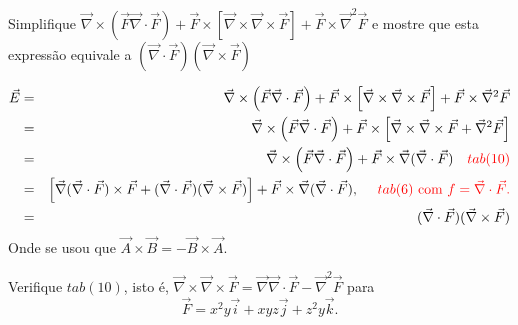 \begin{exeresol}
Simplifique $\vec{\nabla}\times\left(\vec{F}\vec{\nabla}\cdot\vec{F}\right)+\vec{F}\times\left[\vec{\nabla}\times\vec{\nabla}\times \vec{F}\right]+\vec{F}\times \vec{\nabla}^2\vec{F}$ e mostre que esta expressão equivale a $(\vec{\nabla}\cdot\vec{F})(\vec{\nabla}\times\vec{F})$
\end{exeresol}
\begin{resol}
\begin{eqnarray*}
 \vec{E}&=&\vec{\nabla}\times\left(\vec{F}\vec{\nabla}\cdot\vec{F}\right)+\vec{F}\times\left[\vec{\nabla}\times\vec{\nabla}\times \vec{F}\right]+\vec{F}\times \vec{\nabla}^2\vec{F}\\
 &=&\vec{\nabla}\times\left(\vec{F}\vec{\nabla}\cdot\vec{F}\right)+\vec{F}\times\left[\vec{\nabla}\times\vec{\nabla}\times \vec{F}+\vec{\nabla}^2\vec{F}\right]\\
 &=&\vec{\nabla}\times\left(\vec{F}\vec{\nabla}\cdot\vec{F}\right)+\vec{F}\times\vec{\nabla}(\vec{\nabla}\cdot\vec{F}) ~~~{\color{red} tab(10)}\\
 &=&\left[\vec{\nabla}(\vec{\nabla}\cdot \vec{F})\times \vec{F}+(\vec{\nabla}\cdot\vec{F})(\vec{\nabla}\times\vec{F})\right]+\vec{F}\times\vec{\nabla}(\vec{\nabla}\cdot\vec{F}),~~~~{\color{red} tab(6)~\text{com}~f=\vec{\nabla}\cdot\vec{F}.}\\
 &=&(\vec{\nabla}\cdot\vec{F})(\vec{\nabla}\times\vec{F})
 \end{eqnarray*}
 Onde se usou que $\vec{A}\times\vec{B}=-\vec{B}\times\vec{A}$.\\
\end{resol}
\begin{exeresol}

Verifique $tab(10)$, isto é, $\vec{\nabla}\times\vec{\nabla}\times \vec{F}=\vec{\nabla}\vec{\nabla}\cdot \vec{F}-\vec{\nabla}^2\vec{F}$ para $$\vec{F}= x^2y\vec{i}+xyz\vec{j}+z^2y\vec{k}.$$
\end{exeresol}

